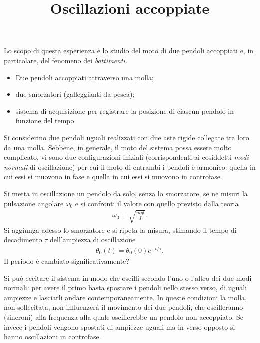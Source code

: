 \documentclass{lab1-article}
\title{Oscillazioni accoppiate}
\begin{document}
\begin{article}

\maketitle

\secsummary

Lo scopo di questa esperienza \`e lo studio del moto di due pendoli accoppiati
e, in particolare, del fenomeno dei \emph{battimenti}.


\secmaterials

\begin{itemize}
\item Due pendoli accoppiati attraverso una molla;
\item due smorzatori (galleggianti da pesca);
\item sistema di acquisizione per registrare la posizione di ciascun pendolo
  in funzione del tempo.
\end{itemize}


\secmeasurements

Si considerino due pendoli uguali realizzati con due aste rigide collegate tra
loro da una molla. Sebbene, in generale, il moto del sistema possa essere
molto complicato, vi sono due configurazioni iniziali (corrispondenti ai
cosiddetti \emph{modi normali} di oscillazione) per cui il moto di entrambi i
pendoli \`e armonico: quella in cui essi si muovono in fase e quella
in cui essi si muovono in controfase.



Si metta in oscillazione un pendolo da solo, senza lo smorzatore, se ne
misuri la pulsazione angolare $\omega_0$ e si confronti il valore con quello
previsto dalla teoria
\begin{align}
  \omega_0 = \sqrt{\frac{mgl}{I}}.
\end{align}
Si aggiunga adesso lo smorzatore e si ripeta la misura, stimando il tempo
di decadimento $\tau$ dell'ampiezza di oscillazione
\begin{align}
  \theta_0(t) = \theta_0(0) e^{-t/\tau}.
\end{align}
Il periodo \`e cambiato significativamente?



Si pu\`o eccitare il sistema in modo che oscilli secondo l'uno o l'altro dei due
modi normali: per avere il primo basta spostare i pendoli nello stesso verso,
di uguali ampiezze e lasciarli andare contemporaneamente. In queste condizioni
la molla, non sollecitata, non influenzer\`a il movimento dei due pendoli, che
oscilleranno (sincroni) alla frequenza alla quale oscillerebbe un pendolo non
accoppiato. Se invece i pendoli vengono spostati di ampiezze uguali ma in verso
opposto si hanno oscillazioni in controfase. 


\end{article}
\end{document}
